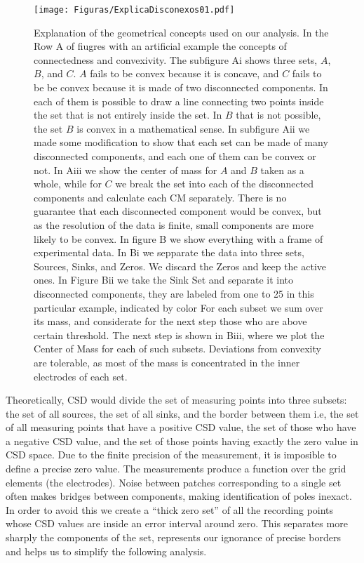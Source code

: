 \documentclass[12pt]{article}
\begin{document}
\begin{figure}
  \texttt{[image: Figuras/ExplicaDisconexos01.pdf]}
  \caption{ Explanation of the geometrical concepts used on our analysis.
    In the Row A of fiugres
    with an artificial example the concepts of connectedness and convexivity.
    The subfigure Ai shows
    three sets, $A$, $B$, and $C$. $A$ fails to be convex because it is concave,
    and $C$ fails to be
    be convex because it is made of two disconnected components.
    In each of them is possible to draw a line
    connecting two points inside the set that is not entirely inside the set.
    In $B$ that is not possible, the set $B$ is convex in a mathematical sense.
    In subfigure Aii we made some modification to show that
    each set can be made of many disconnected components,
    and each one of them can be convex or not.  In Aiii we show the center of
    mass for $A$ and $B$
    taken as a whole, while for $C$ we break the set into each of the disconnected
    components and calculate each CM separately. There is no guarantee that each
    disconnected component would be convex, but as the resolution of the data is finite,
    small components are more likely to
    be convex. In figure B we show everything with a frame of experimental data.
    In Bi we sepparate the
    data into three sets, Sources, Sinks, and Zeros.
    We discard the Zeros and keep the active ones.
    In Figure Bii we take the Sink Set and separate it into disconnected components,
    they are labeled from one to 25 in this particular example,
    indicated by color
    For each subset we sum over its mass, and 
    considerate for the next step those who are above certain threshold. The
    next step is shown in Biii, where we plot the Center of Mass for each of
    such subsets. Deviations
    from convexity are tolerable,
    as most of the mass is concentrated in the inner electrodes
    of each set.
  }
  \label{disconnectedsets}
\end{figure}



Theoretically, CSD would divide the set of measuring points into three subsets: the set of all sources, the set of all sinks, and the border between them i.e, the set of all measuring points that have a positive CSD  value, the set of those who have a negative CSD value, and the set of those points having exactly the zero value in CSD space.
Due to the finite precision of the measurement,
it is imposible to define a precise zero value.
The measurements produce a function over the grid elements (the electrodes).
Noise between patches corresponding to a single set often makes bridges
between components, making identification of poles inexact.
In order to avoid this we create a ``thick zero set'' of all the recording
points whose CSD values are inside an error interval around zero.
This separates more sharply the components of the set,
represents our ignorance of precise borders and helps
us to simplify the following analysis.
\end{document}
